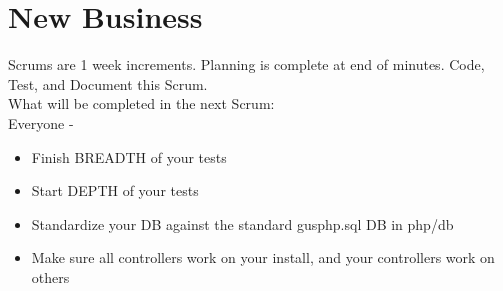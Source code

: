 \documentclass[12pt]{article}
\begin{document}
\section{New Business}
Scrums are 1 week increments. Planning is complete at end of minutes. Code, Test, and Document this Scrum.\\
What will be completed in the next Scrum:\\
Everyone - \\
\begin{itemize}
  \item Finish BREADTH of your tests
  \item Start DEPTH of your tests
  \item Standardize your DB against the standard gusphp.sql DB in php/db
  \item Make sure all controllers work on your install, and your controllers work on others
\end{itemize}
\end{document}
